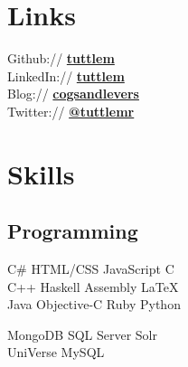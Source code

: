 \documentclass[letterpaper]{deedy-resume} %
\begin{document}
\begin{minipage}[t]{0.33\textwidth} %


\section{Links} 

Github:// \href{https://github.com/tuttlem}{\bf tuttlem} \\
LinkedIn:// \href{http://au.linkedin.com/in/tuttlem/}{\bf tuttlem} \\
Blog:// \href{http://cogsandlevers.blogspot.com/}{\bf cogsandlevers} \\
Twitter:// \href{https://twitter.com/tuttlemr}{\bf @tuttlemr} \\

\sectionspace %


\section{Skills}

\subsection{Programming}

C\# \textbullet{} HTML/CSS \textbullet{} JavaScript \textbullet{} C \\
C++ \textbullet{} Haskell \textbullet{} Assembly \textbullet{} \LaTeX\ \\ 
Java \textbullet{} Objective-C \textbullet{} Ruby \textbullet{} Python

\sectionspace %

MongoDB \textbullet{} SQL Server \textbullet{} Solr \\
UniVerse \textbullet{} MySQL 



\end{minipage} %
\hfill
%
\end{document}
